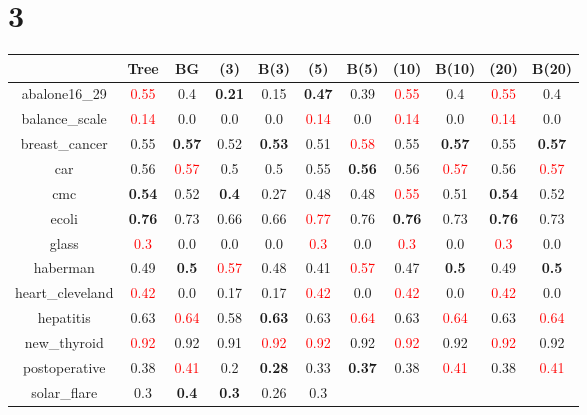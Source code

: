 \documentclass{article}%
\begin{document}
\section*{3}%
\begin{tabular}{c|cccccccccc}%
\hline%
&Tree&BG&(3)&B(3)&(5)&B(5)&(10)&B(10)&(20)&B(20)\\%
\hline%
abalone16\_29&\textcolor{red}{ 
0.55
}&0.4&\textbf{0.21}&0.15&\textbf{0.47}&0.39&\textcolor{red}{ 
0.55
}&0.4&\textcolor{red}{ 
0.55
}&0.4\\%
\hline%
balance\_scale&\textcolor{red}{ 
0.14
}&0.0&0.0&0.0&\textcolor{red}{ 
0.14
}&0.0&\textcolor{red}{ 
0.14
}&0.0&\textcolor{red}{ 
0.14
}&0.0\\%
\hline%
breast\_cancer&0.55&\textbf{0.57}&0.52&\textbf{0.53}&0.51&\textcolor{red}{ 
0.58
}&0.55&\textbf{0.57}&0.55&\textbf{0.57}\\%
\hline%
car&0.56&\textcolor{red}{ 
0.57
}&0.5&0.5&0.55&\textbf{0.56}&0.56&\textcolor{red}{ 
0.57
}&0.56&\textcolor{red}{ 
0.57
}\\%
\hline%
cmc&\textbf{0.54}&0.52&\textbf{0.4}&0.27&0.48&0.48&\textcolor{red}{ 
0.55
}&0.51&\textbf{0.54}&0.52\\%
\hline%
ecoli&\textbf{0.76}&0.73&0.66&0.66&\textcolor{red}{ 
0.77
}&0.76&\textbf{0.76}&0.73&\textbf{0.76}&0.73\\%
\hline%
glass&\textcolor{red}{ 
0.3
}&0.0&0.0&0.0&\textcolor{red}{ 
0.3
}&0.0&\textcolor{red}{ 
0.3
}&0.0&\textcolor{red}{ 
0.3
}&0.0\\%
\hline%
haberman&0.49&\textbf{0.5}&\textcolor{red}{ 
0.57
}&0.48&0.41&\textcolor{red}{ 
0.57
}&0.47&\textbf{0.5}&0.49&\textbf{0.5}\\%
\hline%
heart\_cleveland&\textcolor{red}{ 
0.42
}&0.0&0.17&0.17&\textcolor{red}{ 
0.42
}&0.0&\textcolor{red}{ 
0.42
}&0.0&\textcolor{red}{ 
0.42
}&0.0\\%
\hline%
hepatitis&0.63&\textcolor{red}{ 
0.64
}&0.58&\textbf{0.63}&0.63&\textcolor{red}{ 
0.64
}&0.63&\textcolor{red}{ 
0.64
}&0.63&\textcolor{red}{ 
0.64
}\\%
\hline%
new\_thyroid&\textcolor{red}{ 
0.92
}&0.92&0.91&\textcolor{red}{ 
0.92
}&\textcolor{red}{ 
0.92
}&0.92&\textcolor{red}{ 
0.92
}&0.92&\textcolor{red}{ 
0.92
}&0.92\\%
\hline%
postoperative&0.38&\textcolor{red}{ 
0.41
}&0.2&\textbf{0.28}&0.33&\textbf{0.37}&0.38&\textcolor{red}{ 
0.41
}&0.38&\textcolor{red}{ 
0.41
}\\%
\hline%
solar\_flare&0.3&\textbf{0.4}&\textbf{0.3}&0.26&0.3&\textcolor{red}{ 
}
\end{tabular}
\end{document}
